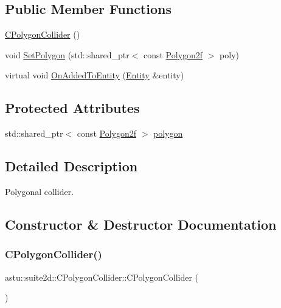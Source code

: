 \subsection*{Public Member Functions}
\begin{DoxyCompactItemize}
\item 
\hyperlink{classastu_1_1suite2d_1_1CPolygonCollider_ab2ff37774a48bd159166ac89764aa384}{C\+Polygon\+Collider} ()
\item 
void \hyperlink{classastu_1_1suite2d_1_1CPolygonCollider_ac3f4b3c6885f72270ecde8ec8a8a4ed5}{Set\+Polygon} (std\+::shared\+\_\+ptr$<$ const \hyperlink{group__math__group_ga39ca0cd425ff5edd2a090d6997ce8c2a}{Polygon2f} $>$ poly)
\item 
virtual void \hyperlink{classastu_1_1suite2d_1_1CPolygonCollider_ac30165a676e92f89e1a840f858d9a050}{On\+Added\+To\+Entity} (\hyperlink{classastu_1_1Entity}{Entity} \&entity)
\end{DoxyCompactItemize}
\subsection*{Protected Attributes}
\begin{DoxyCompactItemize}
\item 
std\+::shared\+\_\+ptr$<$ const \hyperlink{group__math__group_ga39ca0cd425ff5edd2a090d6997ce8c2a}{Polygon2f} $>$ \hyperlink{classastu_1_1suite2d_1_1CPolygonCollider_a5fdae8e0614b5810fb2d1add8b7daf87}{polygon}
\end{DoxyCompactItemize}


\subsection{Detailed Description}
Polygonal collider. 

\subsection{Constructor \& Destructor Documentation}
\mbox{\label{classastu_1_1suite2d_1_1CPolygonCollider_ab2ff37774a48bd159166ac89764aa384}} 
\subsubsection{\texorpdfstring{C\+Polygon\+Collider()}{CPolygonCollider()}}
{\footnotesize\ttfamily astu\+::suite2d\+::\+C\+Polygon\+Collider\+::\+C\+Polygon\+Collider (\begin{DoxyParamCaption}{ }\end{DoxyParamCaption})\hspace{0.3cm}{\ttfamily [inline]}}

